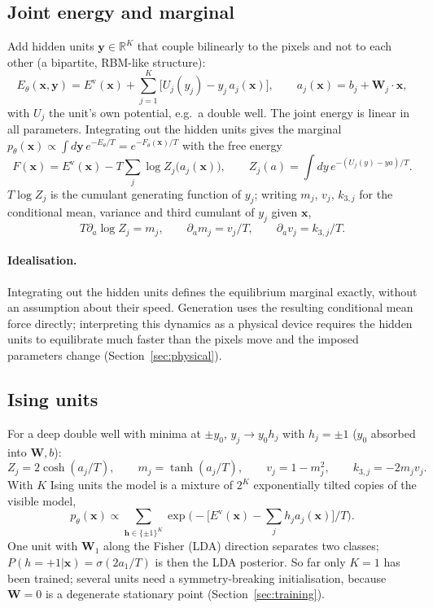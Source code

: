 \documentclass[11pt,a4paper]{article}
\newcommand{\vx}{\bm{x}}
\newcommand{\Ev}{E^{\mathrm{v}}}
\begin{document}
\subsection{Joint energy and marginal}
Add hidden units $\bm y\in\mathbb R^K$ that couple bilinearly to the pixels and not to each other (a bipartite,
RBM-like structure):
\begin{equation}
  E_\theta(\vx,\bm y)=\Ev(\vx)+\sum_{j=1}^K\big[U_j(y_j)-y_j\,a_j(\vx)\big],\qquad a_j(\vx)=b_j+\bm W_j\cdot\vx ,
\end{equation}
with $U_j$ the unit's own potential, e.g.\ a double well. The joint energy is linear in all parameters. Integrating
out the hidden units gives the marginal $p_\theta(\vx)\propto\int d\bm y\,e^{-E_\theta/T}=e^{-F_\theta(\vx)/T}$ with
the free energy
\begin{equation}
  F(\vx)=\Ev(\vx)-T\sum_j\log Z_j\big(a_j(\vx)\big),\qquad Z_j(a)=\int dy\,e^{-(U_j(y)-ya)/T}.
\end{equation}
$T\log Z_j$ is the cumulant generating function of $y_j$; writing $m_j$, $v_j$, $k_{3,j}$ for the conditional mean,
variance and third cumulant of $y_j$ given $\vx$,
\begin{equation}
  T\partial_a\log Z_j=m_j,\qquad\partial_a m_j=v_j/T,\qquad\partial_a v_j=k_{3,j}/T .
\end{equation}

\paragraph{Idealisation.} Integrating out the hidden units defines the equilibrium marginal exactly, without
an assumption about their speed. Generation uses the resulting conditional mean force directly; interpreting
this dynamics as a physical device requires the hidden units to equilibrate much faster than the pixels move
and the imposed parameters change (Section~\ref{sec:physical}).

\subsection{Ising units}
For a deep double well with minima at $\pm y_0$, $y_j\to y_0h_j$ with $h_j=\pm1$ ($y_0$ absorbed into $\bm W,b$):
\begin{equation}
  Z_j=2\cosh(a_j/T),\qquad m_j=\tanh(a_j/T),\qquad v_j=1-m_j^2,\qquad k_{3,j}=-2m_jv_j .
\end{equation}
With $K$ Ising units the model is a mixture of $2^K$ exponentially tilted copies of the visible model,
\begin{equation}
  p_\theta(\vx)\propto\sum_{\bm h\in\{\pm1\}^K}\exp\Big(-\big[\Ev(\vx)-\textstyle\sum_jh_ja_j(\vx)\big]/T\Big).
\end{equation}
One unit with $\bm W_1$ along the Fisher (LDA) direction separates two classes; $P(h=+1|\vx)=\sigma(2a_1/T)$ is then the
LDA posterior. So far only $K=1$ has been trained; several units need a symmetry-breaking initialisation, because
$\bm W=0$ is a degenerate stationary point (Section~\ref{sec:training}).
\end{document}
